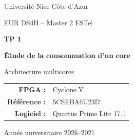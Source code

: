 \documentclass[12pt,a4paper]{article}
\begin{document}

\begin{titlepage}
    \centering

    \vspace*{1.5cm}

    {\Large Université Nice Côte d'Azur\par}

    \vspace{0.3cm}

    {\large EUR DS4H -- Master 2 ESTel\par}

    \vspace{2.5cm}

    {\Huge\bfseries TP 1\par}

    \vspace{0.5cm}

    {\LARGE\bfseries Étude de la consommation d'un core\par}

    \vspace{1.5cm}

    {\Large Architecture multicores\par}

    \vfill

    \begin{tabular}{rl}
        \textbf{FPGA :} & Cyclone V \\
        \textbf{Référence :} & 5CSEBA6U23I7 \\
        \textbf{Logiciel :} & Quartus Prime Lite 17.1 \\
    \end{tabular}

    \vfill

    {\large Année universitaire 2026--2027\par}

\end{titlepage}



\tableofcontents

\newpage


\end{document}
